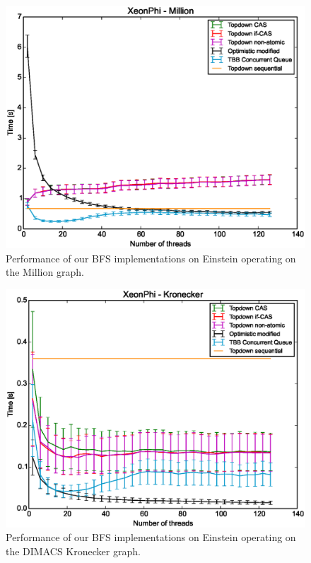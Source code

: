 \documentclass[letterpaper]{article}
\begin{document}
		\begin{figure}[t]
			\centering
	  		\includegraphics[scale=0.33]{einstein_million.eps}
	  		\vspace*{-0.3cm}
	  		\caption{Performance of our BFS implementations on Einstein operating on the Million graph.\label{fig:einsteinbig}}
		\end{figure}
		
		\begin{figure}[t]
			\centering
	  		\includegraphics[scale=0.33]{einstein_dimacskron.eps}
	  		\vspace*{-0.3cm}
	  		\caption{Performance of our BFS implementations on Einstein operating on the DIMACS Kronecker graph.\label{fig:einsteinkron}}
		\end{figure}
		
\end{document}
